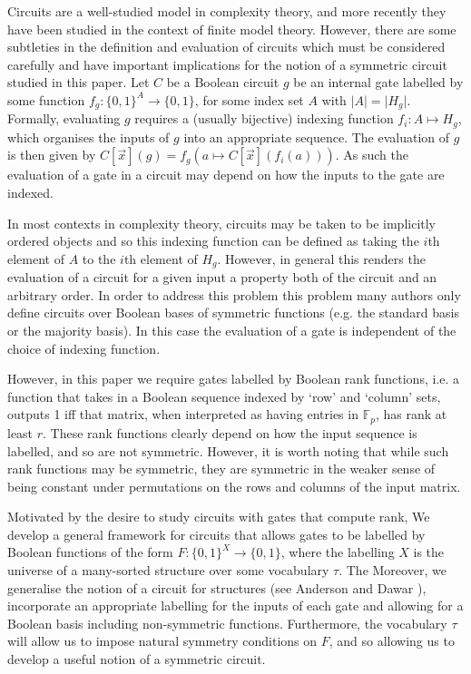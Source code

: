 \documentclass[../paper.tex]{subfiles}
\begin{document}
Circuits are a well-studied model in complexity theory, and more recently they
have been studied in the context of finite model theory. However, there are some
subtleties in the definition and evaluation of circuits which must be considered
carefully and have important implications for the notion of a symmetric circuit
studied in this paper. Let $C$ be a Boolean circuit $g$ be an internal gate
labelled by some function $f_g: \{0,1\}^{A} \rightarrow \{0,1\}$, for some index
set $A$ with $\vert A \vert = \vert H_g \vert$. Formally, evaluating $g$
requires a (usually bijective) indexing function $f_i: A \mapsto H_g$, which
organises the inputs of $g$ into an appropriate sequence. The evaluation of $g$
is then given by $C[\vec{x}](g) = f_g (a \mapsto C[\vec{x}](f_i(a)))$. As such
the evaluation of a gate in a circuit may depend on how the inputs to the gate
are indexed.

In most contexts in complexity theory, circuits may be taken to be implicitly
ordered objects and so this indexing function can be defined as taking the $i$th
element of $A$ to the $i$th element of $H_g$. However, in general this renders
the evaluation of a circuit for a given input a property both of the circuit and
an arbitrary order. In order to address this problem this problem many authors
only define circuits over Boolean bases of symmetric functions (e.g. the
standard basis or the majority basis). In this case the evaluation of a gate is
independent of the choice of indexing function.

However, in this paper we require gates labelled by Boolean rank functions, i.e.
a function that takes in a Boolean sequence indexed by `row' and `column' sets,
outputs 1 iff that matrix, when interpreted as having entries in $\mathbb{F}_p$,
has rank at least $r$. These rank functions clearly depend on how the input
sequence is labelled, and so are not symmetric. However, it is worth noting that
while such rank functions may be symmetric, they are symmetric in the weaker
sense of being constant under permutations on the rows and columns of the input
matrix.

Motivated by the desire to study circuits with gates that compute rank, We
develop a general framework for circuits that allows gates to be labelled by
Boolean functions of the form $F: \{0,1\}^{X} \rightarrow \{0, 1\}$, where the
labelling $X$ is the universe of a many-sorted structure over some vocabulary
$\tau$. The Moreover, we generalise the notion of a circuit for structures (see
Anderson and Dawar \cite{AndersonD17}), incorporate an appropriate labelling for
the inputs of each gate and allowing for a Boolean basis including non-symmetric
functions. Furthermore, the vocabulary $\tau$ will allow us to impose natural
symmetry conditions on $F$, and so allowing us to develop a useful notion of a
symmetric circuit.
\end{document}
